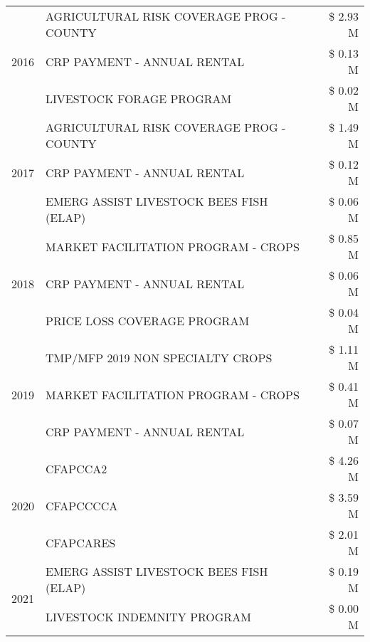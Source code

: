 \begin{tabular}{llr}
\cline{1-3}
\multirow[t]{3}{*}{2016} & AGRICULTURAL RISK COVERAGE PROG - COUNTY & \$ 2.93 M \\
 & CRP PAYMENT - ANNUAL RENTAL & \$ 0.13 M \\
 & LIVESTOCK FORAGE PROGRAM & \$ 0.02 M \\
\cline{1-3}
\multirow[t]{3}{*}{2017} & AGRICULTURAL RISK COVERAGE PROG - COUNTY & \$ 1.49 M \\
 & CRP PAYMENT - ANNUAL RENTAL & \$ 0.12 M \\
 & EMERG ASSIST LIVESTOCK BEES FISH (ELAP) & \$ 0.06 M \\
\cline{1-3}
\multirow[t]{3}{*}{2018} & MARKET FACILITATION PROGRAM - CROPS & \$ 0.85 M \\
 & CRP PAYMENT - ANNUAL RENTAL & \$ 0.06 M \\
 & PRICE LOSS COVERAGE PROGRAM & \$ 0.04 M \\
\cline{1-3}
\multirow[t]{3}{*}{2019} & TMP/MFP 2019 NON SPECIALTY CROPS & \$ 1.11 M \\
 & MARKET FACILITATION PROGRAM - CROPS & \$ 0.41 M \\
 & CRP PAYMENT - ANNUAL RENTAL & \$ 0.07 M \\
\cline{1-3}
\multirow[t]{3}{*}{2020} & CFAPCCA2 & \$ 4.26 M \\
 & CFAPCCCCA & \$ 3.59 M \\
 & CFAPCARES & \$ 2.01 M \\
\cline{1-3}
\multirow[t]{2}{*}{2021} & EMERG ASSIST LIVESTOCK BEES FISH (ELAP) & \$ 0.19 M \\
 & LIVESTOCK INDEMNITY PROGRAM & \$ 0.00 M \\
\cline{1-3}
\bottomrule
\end{tabular}
